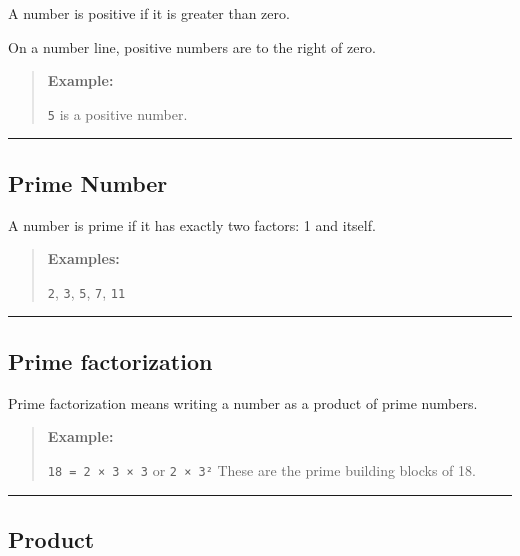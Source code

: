 \documentclass[
  letterpaper,
  DIV=11,
  numbers=noendperiod]{scrreprt}
\begin{document}
A number is positive if it is greater than zero.

On a number line, positive numbers are to the right of zero.

\begin{quote}
\textbf{Example:}

\texttt{5} is a positive number.
\end{quote}

\begin{center}\rule{0.5\linewidth}{0.5pt}\end{center}

\subsection*{Prime Number}\label{glossary-prime-number}

A number is prime if it has exactly two factors: 1 and itself.

\begin{quote}
\textbf{Examples:}

\texttt{2}, \texttt{3}, \texttt{5}, \texttt{7}, \texttt{11}
\end{quote}

\begin{center}\rule{0.5\linewidth}{0.5pt}\end{center}

\subsection*{Prime factorization}\label{glossary-prime-factorization}

Prime factorization means writing a number as a product of prime
numbers.

\begin{quote}
\textbf{Example:}

\texttt{18\ =\ 2\ ×\ 3\ ×\ 3} or \texttt{2\ ×\ 3²} These are the prime
building blocks of 18.
\end{quote}

\begin{center}\rule{0.5\linewidth}{0.5pt}\end{center}

\subsection*{Product}\label{glossary-product}
\end{document}
